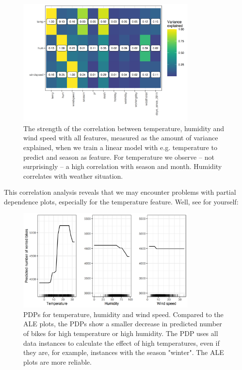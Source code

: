 \documentclass[
  10pt,
]{scrbook}
\begin{document}
\begin{figure}

{\centering \includegraphics[width=0.8\textwidth]{images/ale-bike-cor-1} 

}

\caption{The strength of the correlation between temperature, humidity and wind speed with all features, measured as the amount of variance explained, when we train a linear model with e.g. temperature to predict and season as feature. For temperature we observe -- not surprisingly -- a high correlation with season and month. Humidity correlates with weather situation.}\label{fig:ale-bike-cor}
\end{figure}

This correlation analysis reveals that we may encounter problems with partial dependence plots, especially for the temperature feature.
Well, see for yourself:

\begin{figure}

{\centering \includegraphics[width=0.8\textwidth]{images/pdp-bike-compare-1} 

}

\caption{PDPs for temperature, humidity and wind speed. Compared to the ALE plots, the PDPs show a smaller decrease in predicted number of bikes for high temperature or high humidity. The PDP uses all data instances to calculate the effect of high temperatures, even if they are, for example, instances with the season "winter". The ALE plots are more reliable.}\label{fig:pdp-bike-compare}
\end{figure}
\end{document}
